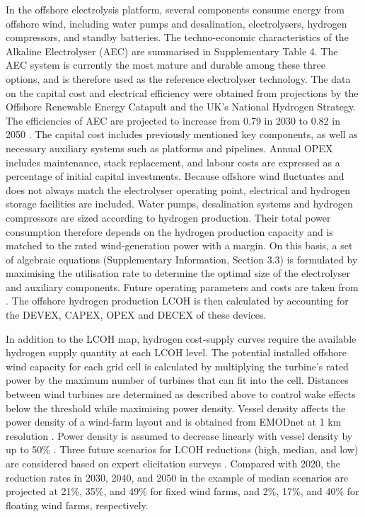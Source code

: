 \documentclass[pdflatex,sn-mathphys,Numbered]{sn-jnl}%
\begin{document}
In the offshore electrolysis platform, several components consume energy from offshore wind, including water pumps and desalination, electrolysers, hydrogen compressors, and standby batteries.
The techno-economic characteristics of the Alkaline Electrolyser (AEC) are summarised in Supplementary Table 4. The AEC system is currently the most mature and durable among these three options, and is therefore used as the reference electrolyser technology. The data on the capital cost and electrical efficiency were obtained from projections by the Offshore Renewable Energy Catapult and the UK's National Hydrogen Strategy. The efficiencies of AEC are projected to increase from 0.79 in 2030 to 0.82 in 2050 \cite{HydrogenAnalyticalAnnex}.
The capital cost includes previously mentioned key components, as well as necessary auxiliary systems such as platforms and pipelines. Annual OPEX includes maintenance, stack replacement, and labour costs are expressed as a percentage of initial capital investments.
Because offshore wind fluctuates and does not always match the electrolyser operating point, electrical and hydrogen storage facilities are included. Water pumps, desalination systems and hydrogen compressors are sized according to hydrogen production. Their total power consumption therefore depends on the hydrogen production capacity and is matched to the rated wind-generation power with a margin. On this basis, a set of algebraic equations (Supplementary Information, Section 3.3) is formulated by maximising the utilisation rate to determine the optimal size of the electrolyser and auxiliary components. Future operating parameters and costs are taken from \cite{OffshoreWindandHydrogen}. The offshore hydrogen production LCOH is then calculated by accounting for the DEVEX, CAPEX, OPEX and DECEX of these devices.

In addition to the LCOH map, hydrogen cost-supply curves require the available hydrogen supply quantity at each LCOH level. The potential installed
offshore wind capacity for each grid cell is calculated by multiplying the turbine's rated power by the maximum number of turbines that can fit into the cell. Distances between wind turbines are determined as described above to control wake effects below the threshold while maximising power density. Vessel density affects the power density of a wind-farm layout and is obtained from EMODnet at 1 km resolution \cite{RouteDensityMap}. Power density is assumed to decrease linearly with vessel density by up to 50\% \cite{guo2023grid}.
Three future scenarios for LCOH reductions (high, median, and low) are considered based on expert elicitation surveys \cite{wiser2021expert}. Compared with 2020, the reduction rates in 2030, 2040, and 2050 in the example of median scenarios are projected at 21\%, 35\%, and 49\% for fixed wind farms, and 2\%, 17\%, and 40\% for floating wind farms, respectively.
\end{document}
